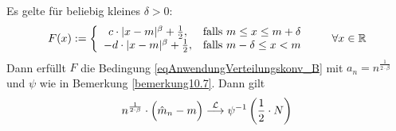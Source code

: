 \begin{beispiel}\label{beispiel10.9}
	Es gelte für beliebig kleines $\delta>0$:
	\begin{align*}
		F(x):=\left\lbrace\begin{array}{cl}
			c\cdot|x-m|^\beta+\frac{1}{2},&\text{falls } m\leq x\leq m+\delta\\
			-d\cdot|x-m|^\beta+\frac{1}{2},&\text{falls } m-\delta\leq x<m
		\end{array}\right.\qquad\forall x\in\mathbb{R}
	\end{align*}
	Dann erfüllt $F$ die Bedingung \eqref{eqAnwendungVerteilungskonv_B} mit $a_n=n^{\frac{1}{2\cdot\beta}}$ und $\psi$ wie in Bemerkung \ref{bemerkung10.7}.
	Dann gilt
	\begin{align*}
		n^{\frac{1}{2\cdot\beta}}\cdot\Big(\hat{m}_n-m\Big)\overset{\mathcal{L}}{\longrightarrow}\psi^{-1}\left(\frac{1}{2}\cdot N\right)
	\end{align*}
\end{beispiel}

